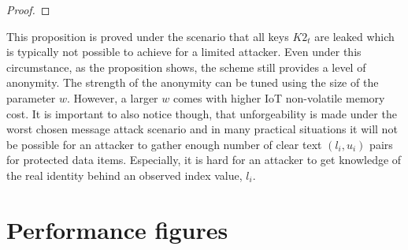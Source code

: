 {\begin{proof}
\end{proof}
This proposition is proved under the scenario that all keys $K2_t$ are leaked which is typically not possible to achieve for a limited attacker. Even under this circumstance, as the proposition shows, the scheme still provides a level of anonymity. The strength of the anonymity can be tuned using the size of the parameter $w$. However, a larger $w$ comes with higher IoT non-volatile memory cost. It is important to also notice though, that unforgeability is made under the worst chosen message attack scenario and in many practical situations it will not be possible for an attacker to gather enough number of clear text $(l_{i}, u_i)$ pairs for protected data items. Especially, it is hard for an attacker to get knowledge of the real identity behind an observed index value, $l_i$. 

\graphicspath{{Performance/images/}}
\label{peranalysis}
\section{Performance figures}

}
